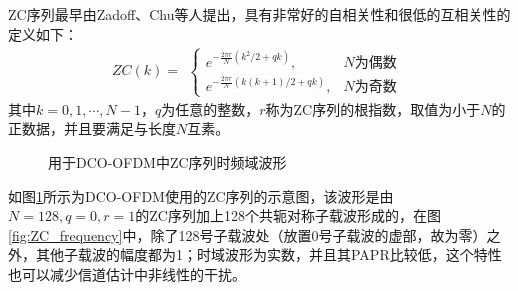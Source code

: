 ZC序列最早由Zadoff、Chu等人提出，具有非常好的自相关性和很低的互相关性的定义如下：
\begin{equation}
ZC(k)=
\begin{aligned}
\begin{cases}
e^{-\frac{2\pi r}{N}(k^2/2+qk)}, &N\text{为偶数}\\
e^{-\frac{2\pi r}{N}(k(k+1)/2+qk)}, &N\text{为奇数}
\end{cases}
\end{aligned}
\end{equation}
其中$k=0,1,\cdots,N-1$，$q$为任意的整数，$r$称为ZC序列的根指数，取值为小于$N$的正数据，并且要满足与长度$N$互素。
\begin{figure}[htbp]
    \centering
    \caption{用于DCO-OFDM中ZC序列时频域波形}
    \label{fig:ZC_frequency_time}
\end{figure}
如图\ref{fig:ZC_frequency_time}所示为DCO-OFDM使用的ZC序列的示意图，该波形是由$N=128,q=0,r=1$的ZC序列加上128个共轭对称子载波形成的，在图\ref{fig:ZC_frequency}中，除了128号子载波处（放置0号子载波的虚部，故为零）之外，其他子载波的幅度都为1；时域波形为实数，并且其PAPR比较低，这个特性也可以减少信道估计中非线性的干扰。
